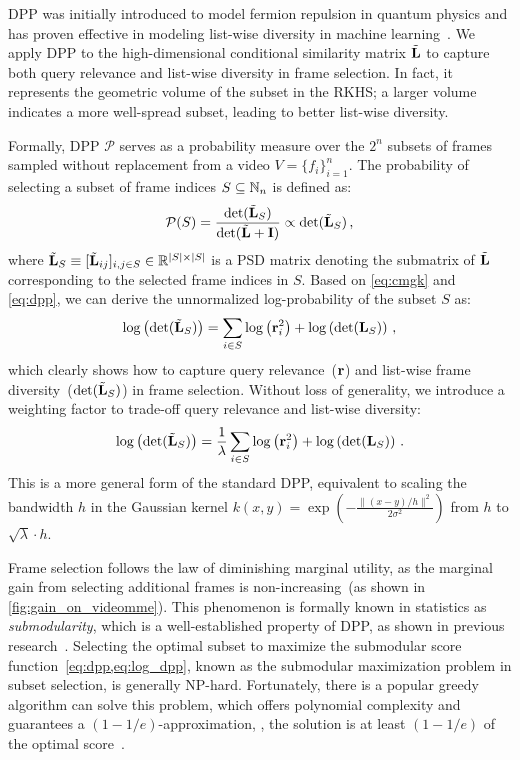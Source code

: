 DPP was initially introduced to model fermion repulsion in quantum physics and has proven effective in modeling list-wise diversity in machine learning~\cite{ye2023compositional,chen2018fast}.
We apply DPP to the high-dimensional conditional similarity matrix \(\tilde{\mathbf{L}}\) to capture both query relevance and list-wise diversity in frame selection.
In fact, it represents the geometric volume of the subset in the RKHS; a larger volume indicates a more well-spread subset, leading to better list-wise diversity. 


Formally, DPP \(\mathcal{P}\) serves as a probability measure over the \(2^n\) subsets of frames sampled without replacement from a video \(V = \{f_i\}_{i=1}^{n}\).
The probability of selecting a subset of frame indices \(S \subseteq \mathbb{N}_n\) is defined as:
\begin{equation}\label{eq:dpp}
	\mathcal{P}(S)=\frac{\det(\tilde{\mathbf{L}}_S)}{\det({\tilde{\mathbf{L}} + \mathbf{I}})} \propto \det(\tilde{\mathbf{L}}_S) \,,
\end{equation}
where \(\tilde{\mathbf{L}}_S \equiv [\tilde{\mathbf{L}}_{ij}]_{i,j \in S} \in \mathbb{R}^{|S|\times|S|}\) is a PSD matrix denoting the submatrix of \(\tilde{\mathbf{L}}\) corresponding to the selected frame indices in \(S\).
%
Based on \cref{eq:cmgk} and \cref{eq:dpp}, we can derive the unnormalized log-probability of the subset \(S\) as:
\begin{equation}
	\log\left(\det(\tilde{\mathbf{L}}_S)\right) = \sum_{i\in S}\log\left(\mathbf{r}_i^2\right) + \log\left(\det(\mathbf{L}_S)\right)\,,
\end{equation}
which clearly shows how to capture query relevance~(\ie \(\mathbf{r}\)) and list-wise frame diversity~(\ie \(\det(\tilde{\mathbf{L}}_S)\)) in frame selection.
Without loss of generality, we introduce a weighting factor to trade-off query relevance and list-wise diversity:
\begin{equation}\label{eq:log_dpp}
	\log \left( \det(\tilde{\mathbf{L}}_S) \right) = \frac{1}{\lambda} \sum_{i \in S} \log\left(\mathbf{r}_i^2\right) + \log\left(\det(\mathbf{L}_S)\right)\,.
\end{equation}
This is a more general form of the standard DPP, equivalent to scaling the bandwidth \(h\) in the Gaussian kernel \mbox{\(k(x,y) = \exp\left(-\frac{\| (x-y)/h \|^2}{2\sigma^2}\right)\)} from \(h\) to \(\sqrt{\lambda} \cdot h\).



Frame selection follows the law of diminishing marginal utility, 
as the marginal gain from selecting additional frames is non-increasing~(as shown in \cref{fig:gain_on_videomme}).
This phenomenon is formally known in statistics as \emph{submodularity}, 
which is a well-established property of DPP, as shown in previous research~\cite{fujishige2005submodular,krause2014submodular}.
%
Selecting the optimal subset to maximize the submodular score function~\cref{eq:dpp,eq:log_dpp}, known as the submodular maximization problem in subset selection, is generally NP-hard.
Fortunately, there is a popular greedy algorithm can solve this problem,
which offers polynomial complexity and guarantees a \((1 - 1/e)\)-approximation, \ie, the solution is at least \((1 - 1/e)\) of the optimal score~\cite{chen2018fast}.

